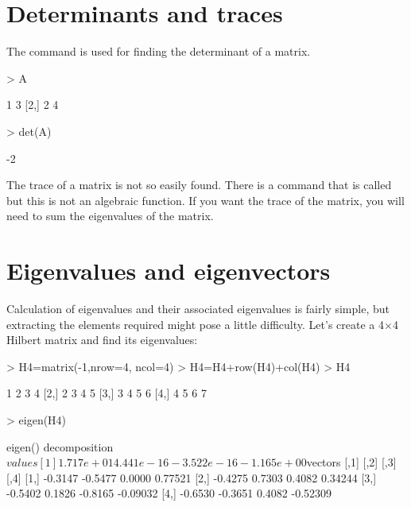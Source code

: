  
\section{Determinants and traces} 
 
The  command is used for finding the determinant of a matrix. 

\begin{Schunk}
\begin{Sinput}
> A 
\end{Sinput}
\begin{Soutput}
     [,1] [,2]
[1,]    1    3
[2,]    2    4
\end{Soutput}
\begin{Sinput}
> det(A) 
\end{Sinput}
\begin{Soutput}
[1] -2
\end{Soutput}
\end{Schunk}

 
The trace of a matrix is not so easily found. There is a command that is called  but this is not an algebraic function. If you want the trace of the matrix, you will need to sum the eigenvalues of the matrix. 
 
\section{Eigenvalues and eigenvectors} 
 
Calculation of eigenvalues and their associated eigenvalues is fairly simple, but extracting the elements required might pose a little difficulty. 
 Let's create a 4$\times$4 Hilbert matrix and find its eigenvalues: 

\begin{Schunk}
\begin{Sinput}
> H4=matrix(-1,nrow=4, ncol=4) 
> H4=H4+row(H4)+col(H4) 
> H4 
\end{Sinput}
\begin{Soutput}
     [,1] [,2] [,3] [,4]
[1,]    1    2    3    4
[2,]    2    3    4    5
[3,]    3    4    5    6
[4,]    4    5    6    7
\end{Soutput}
\begin{Sinput}
> eigen(H4) 
\end{Sinput}
\begin{Soutput}
eigen() decomposition
$values
[1]  1.717e+01  4.441e-16 -3.522e-16 -1.165e+00

$vectors
        [,1]    [,2]    [,3]     [,4]
[1,] -0.3147 -0.5477  0.0000  0.77521
[2,] -0.4275  0.7303  0.4082  0.34244
[3,] -0.5402  0.1826 -0.8165 -0.09032
[4,] -0.6530 -0.3651  0.4082 -0.52309
\end{Soutput}
\end{Schunk}

